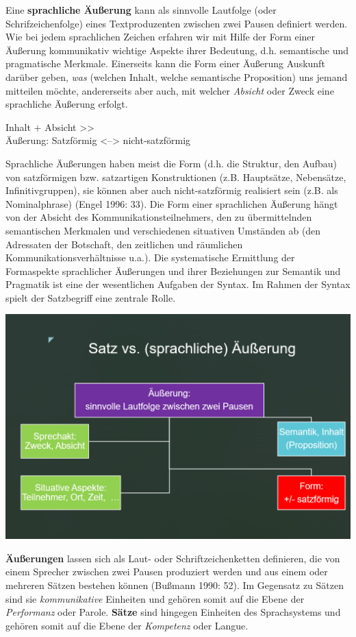 \documentclass[
  letterpaper,
  DIV=11,
  numbers=noendperiod]{scrreprt}
\begin{document}
Eine \textbf{sprachliche Äußerung} kann als sinnvolle Lautfolge (oder
Schrifzeichenfolge) eines Textproduzenten zwischen zwei Pausen definiert
werden. Wie bei jedem sprachlichen Zeichen erfahren wir mit Hilfe der
Form einer Äußerung kommunikativ wichtige Aspekte ihrer Bedeutung, d.h.
semantische und pragmatische Merkmale. Einerseits kann die Form einer
Äußerung Auskunft darüber geben, \emph{was} (welchen Inhalt, welche
semantische Proposition) uns jemand mitteilen möchte, andererseits aber
auch, mit welcher \emph{Absicht} oder Zweck eine sprachliche Äußerung
erfolgt.

Inhalt + Absicht \textgreater\textgreater{}\\
Äußerung: Satzförmig \textless--\textgreater{} nicht-satzförmig

Sprachliche Äußerungen haben meist die Form (d.h. die Struktur, den
Aufbau) von satzförmigen bzw. satzartigen Konstruktionen (z.B.
Hauptsätze, Nebensätze, Infinitivgruppen), sie können aber auch
nicht-satzförmig realisiert sein (z.B. als Nominalphrase) (Engel 1996:
33). Die Form einer sprachlichen Äußerung hängt von der Absicht des
Kommunikationsteilnehmers, den zu übermittelnden semantischen Merkmalen
und verschiedenen situativen Umständen ab (den Adressaten der Botschaft,
den zeitlichen und räumlichen Kommunikationsverhältnisse u.a.). Die
systematische Ermittlung der Formaspekte sprachlicher Äußerungen und
ihrer Beziehungen zur Semantik und Pragmatik ist eine der wesentlichen
Aufgaben der Syntax. Im Rahmen der Syntax spielt der Satzbegriff eine
zentrale Rolle.

\includegraphics[width=1\textwidth,height=\textheight]{./pictures/aeusserung_vs_satz.png}

\textbf{Äußerungen} lassen sich als Laut- oder Schriftzeichenketten
definieren, die von einem Sprecher zwischen zwei Pausen produziert
werden und aus einem oder mehreren Sätzen bestehen können (Bußmann 1990:
52). Im Gegensatz zu Sätzen sind sie \emph{kommunikative} Einheiten und
gehören somit auf die Ebene der \emph{Performanz} oder Parole.
\textbf{Sätze} sind hingegen Einheiten des Sprachsystems und gehören
somit auf die Ebene der \emph{Kompetenz} oder Langue.
\end{document}
